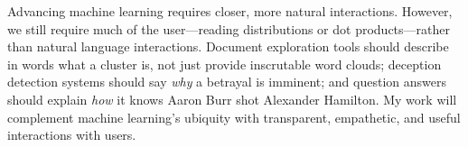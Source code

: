 \documentclass[11pt]{amsart}
\begin{document}
Advancing machine learning requires closer, more natural interactions.  However,
we still require much of the user---reading distributions or dot
products---rather than natural language interactions.  Document exploration
tools should describe in words what a cluster is, not just provide inscrutable
word clouds; deception detection systems should say \emph{why} a betrayal is
imminent; and question answers should explain \emph{how} it knows Aaron Burr
shot Alexander Hamilton. My work will complement machine learning's ubiquity
with transparent, empathetic, and useful interactions with users.


%

\end{document}
